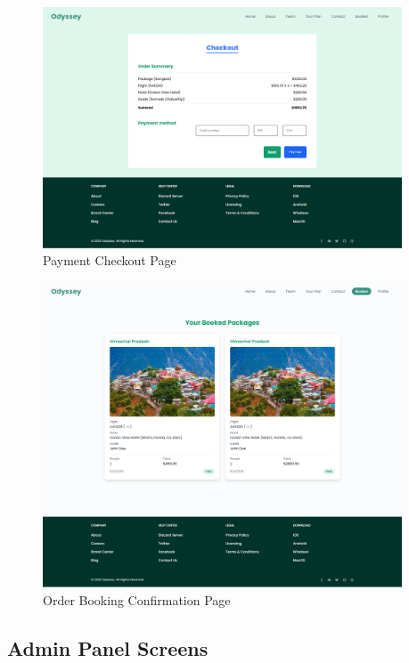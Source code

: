 \begin{figure}[H]
    \centering
    \includegraphics[width=0.95\textwidth]{./figures/frontend/8.png}
    \caption{Payment Checkout Page}
    \label{fig:payment_checkout}
\end{figure}

\begin{figure}[H]
    \centering
    \includegraphics[width=0.95\textwidth]{./figures/frontend/9.png}
    \caption{Order Booking Confirmation Page}
    \label{fig:order_booking}
\end{figure}

\subsection*{Admin Panel Screens}

